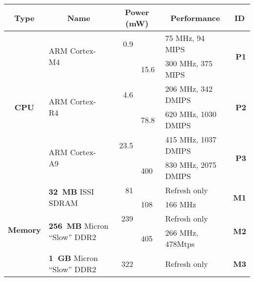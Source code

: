 \begin{table}[t]
\begin{threeparttable}
{\footnotesize
\begin{tabularx}{\textwidth}{clrlXr}

\multicolumn{1}{c}{\textbf{\large{Type}}} &
\multicolumn{1}{c}{\textbf{\large{Name}}} &
\multicolumn{2}{c}{\textbf{\large{Power (mW)}}} &
\multicolumn{1}{c}{\textbf{\large{Performance}}} &
\multicolumn{1}{c}{\textbf{\large{ID}}}
\\ \toprule 

\multirow{6}{*}{\vspace{-0.15in}\textbf{CPU}} &
\multirow{2}{*}{ARM Cortex-M4\tnote{11}~\cite{cortexm4-web}} &
0.9\tnote{1} & &
75 MHz, 94 MIPS\tnote{2} &
\multirow{2}{*}{\textbf{P1}}
\\

& & &
15.6 &
300 MHz, 375 MIPS
&
\\ \cmidrule(l){2-6}

& \multirow{2}{*}{ARM Cortex-R4\tnote{11}~\cite{cortexr4-web}} &
4.6\tnote{1} & &
206 MHz, 342 DMIPS\tnote{2} &
\multirow{2}{*}{\textbf{P2}}
\\

& & &
78.8 &
620 MHz, 1030 DMIPS
&
\\ \cmidrule(l){2-6}

& \multirow{2}{*}{ARM Cortex-A9~\cite{cortexa9-web}} &
23.5\tnote{1} & &
415 MHz, 1037 DMIPS\tnote{2} &
\multirow{2}{*}{\textbf{P3}}
\\

& & &
400 &
830 MHz, 2075 DMIPS
&
\\ \toprule

\multirow{8}{*}{\vspace*{-0.15in}\textbf{Memory}} &
\multirow{2}{*}{\textbf{32~MB} ISSI SDRAM~\cite{issi32MBsdram-datasheet}} &
81 & &
Refresh only &
\multirow{2}{*}{\textbf{M1}}
\\

& & &
108 &
166 MHz
&
\\ \cmidrule(l){2-6}

&
\multirow{2}{*}{\textbf{256~MB} Micron ``Slow'' DDR2} &
239\tnote{10} & &
Refresh only &
\multirow{2}{*}{\textbf{M2}}
\\

& & &
405 &
266 MHz, 478Mtps
&
\\ \cmidrule(l){2-6}

&
\multirow{2}{*}{\textbf{1~GB} Micron ``Slow'' DDR2} &
322\tnote{10} & &
Refresh only &
\multirow{2}{*}{\textbf{M3}}
\\


\end{tabularx}}
\end{threeparttable}
\end{table}
